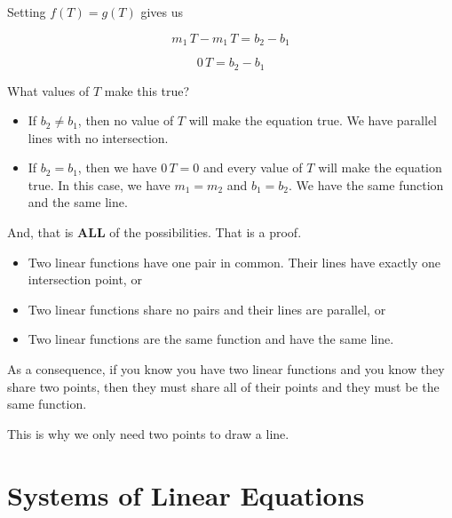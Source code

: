 \documentclass{ximera}
\begin{document}
\begin{explanation}
Setting $f(T) = g(T)$ gives us 



\[     m_1 \, T - m_1 \, T =  b_2 - b_1 \]


\[     0 \, T =  b_2 - b_1 \]


What values of $T$ make this true?


\begin{itemize}
\item If $b_2 \ne b_1$, then no value of $T$ will make the equation true.  We have parallel lines with no intersection.

\item If $b_2 = b_1$, then we have $0 \, T =  0$ and every value of $T$ will make the equation true.  In this case, we have $m_1 = m_2$ and $b_1 = b_2$.  We have the same function and the same line.
\end{itemize}



And, that is \textbf{\textcolor{purple!85!blue}{ALL}} of the possibilities.  That is a proof.


\begin{itemize}
\item Two linear functions have one pair in common. Their lines have exactly one intersection point, or

\item Two linear functions share no pairs and their lines are parallel, or

\item Two linear functions are the same function and have the same line.



\end{itemize}





\end{explanation}


As a consequence, if you know you have two linear functions and you know they share two points, then they must share all of their points and they must be the same function.   

This is why we only need two points to draw a line.
















\section{Systems of Linear Equations}
\end{document}
